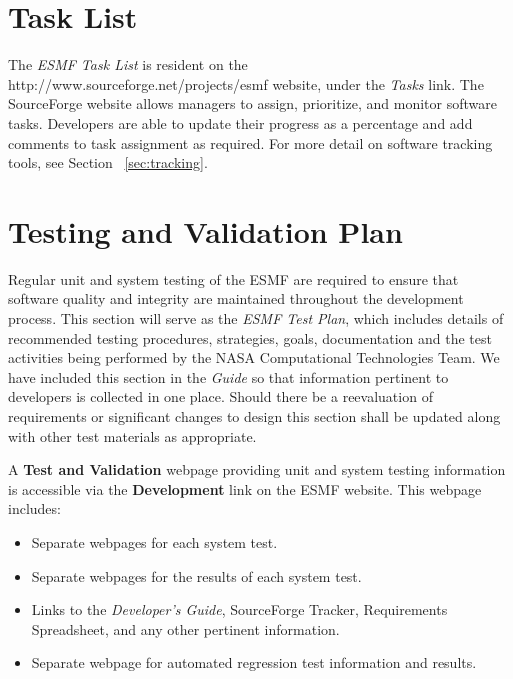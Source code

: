 
\section{Task List}
\label{sec:build}

The {\it ESMF Task List} is resident on the 
{http://www.sourceforge.net/projects/esmf} website, under the 
{\it Tasks} link. The SourceForge website allows managers to
assign, prioritize, and monitor software tasks. Developers are
able to update their progress as a percentage and add comments to
task assignment as required. For more detail on software
tracking tools, see Section ~\ref{sec:tracking}.

\section{Testing and Validation Plan}
\label{sec:testing}

Regular unit and system testing of the ESMF are required to ensure that 
software quality and integrity are maintained throughout 
the development process.  This section will serve as 
the {\it ESMF Test Plan}, which includes details 
of recommended testing procedures, strategies, goals, documentation 
and the test activities being performed by the NASA Computational 
Technologies Team.
We have included this section in the {\it Guide} 
so that information pertinent to developers is collected in one 
place.  Should there be a reevaluation of requirements or significant 
changes to design this section shall be updated along with other 
test materials as appropriate.

A {\bf Test and Validation} webpage providing unit and system testing 
information is accessible via the {\bf Development} link on the ESMF 
website. This webpage includes:
\begin{itemize}
\item Separate webpages for each system test.
\item Separate webpages for the results of each system test.
\item Links to the {\it Developer's Guide}, SourceForge Tracker, Requirements 
Spreadsheet, and any other pertinent information.
\item Separate webpage for automated regression test information and results.
\end{itemize}

